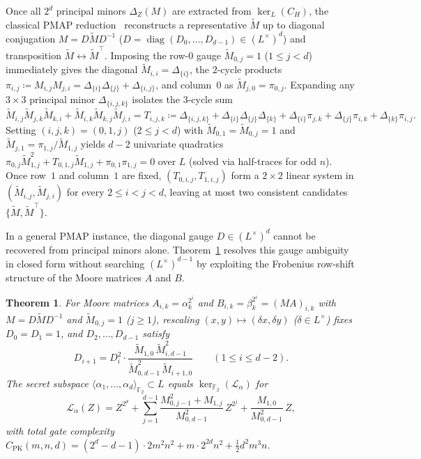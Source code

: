 \documentclass[11pt,a4paper]{article}
\newtheorem{theorem}{Theorem}
\theoremstyle{definition}
\theoremstyle{remark}
\newcommand{\Ftwo}{\mathbb{F}_2}
\newcommand{\diag}{\operatorname{diag}}
\begin{document}
Once all $2^d$ principal minors $\Delta_Z(M)$ are extracted from $\ker_L(C_H)$, the classical PMAP reduction~\cite{Loewy86,GT06} reconstructs a representative $\tilde{M}$ up to diagonal conjugation $M = D \tilde{M} D^{-1}$ ($D = \diag(D_0, \dots, D_{d-1}) \in (L^\times)^d$) and transposition $\tilde{M} \leftrightarrow \tilde{M}^\top$. Imposing the row-$0$ gauge $\tilde{M}_{0,j} = 1$ ($1 \le j < d$) immediately gives the diagonal $\tilde{M}_{i,i} = \Delta_{\{i\}}$, the $2$-cycle products $\pi_{i,j} \coloneqq M_{i,j}M_{j,i} = \Delta_{\{i\}}\Delta_{\{j\}} + \Delta_{\{i,j\}}$, and column~$0$ as $\tilde{M}_{j,0} = \pi_{0,j}$. Expanding any $3 \times 3$ principal minor $\Delta_{\{i,j,k\}}$ isolates the $3$-cycle sum
\[
    \tilde{M}_{i,j}\tilde{M}_{j,k}\tilde{M}_{k,i} + \tilde{M}_{i,k}\tilde{M}_{k,j}\tilde{M}_{j,i} = T_{i,j,k} \coloneqq \Delta_{\{i,j,k\}} + \Delta_{\{i\}}\Delta_{\{j\}}\Delta_{\{k\}} + \Delta_{\{i\}}\pi_{j,k} + \Delta_{\{j\}}\pi_{i,k} + \Delta_{\{k\}}\pi_{i,j}.
\]
Setting $(i, j, k) = (0, 1, j)$ ($2 \le j < d$) with $\tilde{M}_{0,1} = \tilde{M}_{0,j} = 1$ and $\tilde{M}_{j,1} = \pi_{1,j}/\tilde{M}_{1,j}$ yields $d - 2$ univariate quadratics $\pi_{0,j} \tilde{M}_{1,j}^2 + T_{0,1,j} \tilde{M}_{1,j} + \pi_{0,1}\pi_{1,j} = 0$ over $L$ (solved via half-traces for odd $n$). Once row~$1$ and column~$1$ are fixed, $(T_{0,i,j}, T_{1,i,j})$ form a $2 \times 2$ linear system in $(\tilde{M}_{i,j}, \tilde{M}_{j,i})$ for every $2 \le i < j < d$, leaving at most two consistent candidates $\{\tilde{M}, \tilde{M}^\top\}$.

In a general PMAP instance, the diagonal gauge $D \in (L^\times)^d$ cannot be recovered from principal minors alone. Theorem~\ref{thm:moore-rec} resolves this gauge ambiguity in closed form without searching $(L^\times)^{d-1}$ by exploiting the Frobenius row-shift structure of the Moore matrices $A$ and $B$.

\begin{theorem}
\label{thm:moore-rec}
For Moore matrices $A_{i,k} = \alpha_k^{2^i}$ and $B_{i,k} = \beta_k^{2^i} = (M A)_{i,k}$ with $M = D \tilde{M} D^{-1}$ and $\tilde{M}_{0,j} = 1$ ($j \ge 1$), rescaling $(x, y) \mapsto (\delta x, \delta y)$ ($\delta \in L^\times$) fixes $D_0 = D_1 = 1$, and $D_2, \dots, D_{d-1}$ satisfy
\begin{equation}
\label{eq:moore-recursion}
    D_{i+1} = D_i^2 \cdot \frac{\tilde{M}_{1,0}\,\tilde{M}_{i,d-1}^2}{\tilde{M}_{0,d-1}^2\,\tilde{M}_{i+1,0}} \qquad (1 \le i \le d - 2).
\end{equation}
The secret subspace $\langle \alpha_1, \dots, \alpha_d \rangle_{\Ftwo} \subset L$ equals $\ker_{\Ftwo}(\mathcal{L}_\alpha)$ for
\begin{equation}
\label{eq:L-alpha}
    \mathcal{L}_\alpha(Z) = Z^{2^d} + \sum_{j=1}^{d-1} \frac{M_{0,j-1}^2 + M_{1,j}}{M_{0,d-1}^2}\, Z^{2^j} + \frac{M_{1,0}}{M_{0,d-1}^2}\, Z,
\end{equation}
with total gate complexity $C_{\text{PK}}(m, n, d) = (2^d - d - 1) \cdot 2 m^2 n^2 + m \cdot 2^{2d} n^2 + \frac{1}{2} d^2 m^3 n$.
\end{theorem}
\end{document}
